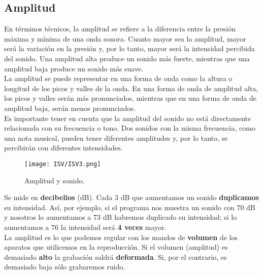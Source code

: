 \documentclass[
	12pt, %
	fleqn, %
	a4paper, %
	oneside, %
]{LegrandOrangeBook}
\begin{document}
\subsection{Amplitud}
En términos técnicos, la amplitud se refiere a la diferencia entre la presión máxima y mínima de una onda sonora. Cuanto mayor sea la amplitud, mayor será la variación en la presión y, por lo tanto, mayor será la intensidad percibida del sonido. Una amplitud alta produce un sonido más fuerte, mientras que una amplitud baja produce un sonido más suave.\\
La amplitud se puede representar en una forma de onda como la altura o longitud de los picos y valles de la onda. En una forma de onda de amplitud alta, los picos y valles serán más pronunciados, mientras que en una forma de onda de amplitud baja, serán menos pronunciados.\\
Es importante tener en cuenta que la amplitud del sonido no está directamente relacionada con su frecuencia o tono. Dos sonidos con la misma frecuencia, como una nota musical, pueden tener diferentes amplitudes y, por lo tanto, se percibirán con diferentes intensidades.
\begin{figure}[H]
\centering
\texttt{[image: ISV/ISV3.png]}
\caption{Amplitud y sonido.}
\end{figure}
Se mide en \textbf{decibelios} (dB). Cada 3 dB que aumentamos un sonido \textbf{duplicamos} su intensidad. Así, por ejemplo, si el programa nos muestra un sonido con 70 dB y nosotros lo aumentamos a 73 dB habremos duplicado su intensidad; si lo aumentamos a 76 la intensidad será \textbf{4 veces} mayor. \\
La amplitud es lo que podemos regular con los mandos de \textbf{volumen} de los aparatos que utilicemos en la reproducción. Si el volumen (amplitud) es demasiado \textbf{alto} la grabación saldrá \textbf{deformada}. Si, por el contrario, es demasiado baja sólo grabaremos ruido.
\end{document}
